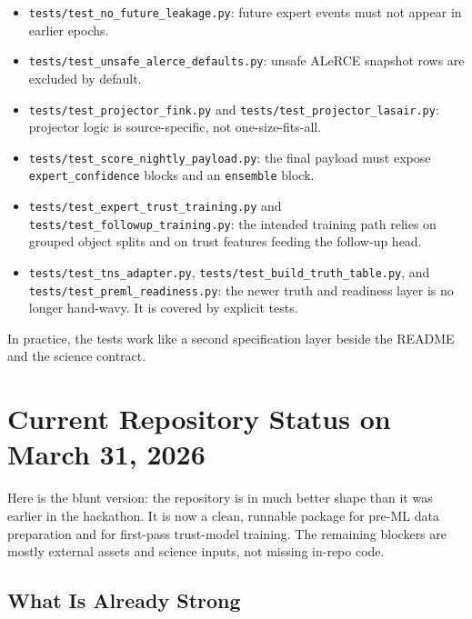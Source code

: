 \documentclass[11pt]{article}
\newcommand{\code}[1]{\texttt{#1}}
\begin{document}
\begin{itemize}
\item \code{tests/test\_no\_future\_leakage.py}: future expert events must not appear in earlier epochs.
\item \code{tests/test\_unsafe\_alerce\_defaults.py}: unsafe ALeRCE snapshot rows are excluded by default.
\item \code{tests/test\_projector\_fink.py} and \code{tests/test\_projector\_lasair.py}: projector logic is source-specific, not one-size-fits-all.
\item \code{tests/test\_score\_nightly\_payload.py}: the final payload must expose \code{expert\_confidence} blocks and an \code{ensemble} block.
\item \code{tests/test\_expert\_trust\_training.py} and \code{tests/test\_followup\_training.py}: the intended training path relies on grouped object splits and on trust features feeding the follow-up head.
\item \code{tests/test\_tns\_adapter.py}, \code{tests/test\_build\_truth\_table.py}, and \code{tests/test\_preml\_readiness.py}: the newer truth and readiness layer is no longer hand-wavy. It is covered by explicit tests.
\end{itemize}

In practice, the tests work like a second specification layer beside the README and the science contract.

\section{Current Repository Status on March 31, 2026}

Here is the blunt version: the repository is in much better shape than it was earlier in the hackathon. It is now a clean, runnable package for pre-ML data preparation and for first-pass trust-model training. The remaining blockers are mostly external assets and science inputs, not missing in-repo code.

\subsection{What Is Already Strong}
\end{document}
